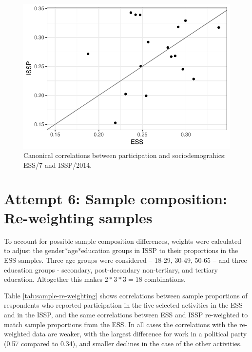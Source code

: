 \documentclass[12pt,]{article}
\begin{document}
\begin{figure}[H]

{\centering \includegraphics{report_files/figure-latex/can-cor-1} 

}

\caption{Canonical correlations between participation and sociodemograhics: ESS/7 and ISSP/2014.}\label{fig:can-cor}
\end{figure}

\hypertarget{attempt-6-sample-composition-re-weighting-samples}{%
\section{Attempt 6: Sample composition: Re-weighting samples}\label{attempt-6-sample-composition-re-weighting-samples}}

To account for possible sample composition differences, weights were calculated to adjust the gender*age*education groups in ISSP to their proportions in the ESS samples. Three age groups were considered -- 18-29, 30-49, 50-65 -- and three education groups - secondary, post-decondary non-tertiary, and tertiary education. Altogether this makes \(2*3*3=18\) combinations.

Table \ref{tab:sample-re-weighting} shows correlations between sample proportions of respondents who reported participation in the five selected activities in the ESS and in the ISSP, and the same correlations between ESS and ISSP re-weighted to match sample proportions from the ESS. In all cases the correlations with the re-weighted data are weaker, with the largest difference for work in a political party (0.57 compared to 0.34), and smaller declines in the case of the other activities.
\end{document}
